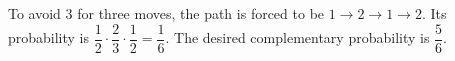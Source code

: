 To avoid $3$ for three moves, the path is forced to be $1\to2\to1\to2$. Its probability is $\dfrac{1}{2}\cdot\dfrac{2}{3}\cdot\dfrac{1}{2}=\dfrac{1}{6}$. The desired complementary probability is $\boxed{\dfrac{5}{6}}$.
